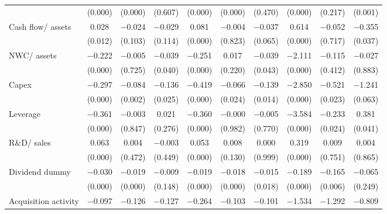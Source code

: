 \begin{longtable}{l*{9}{c}}
                    &     (0.000)&     (0.000)&     (0.607)&     (0.000)&     (0.000)&     (0.470)&     (0.000)&     (0.217)&     (0.001)\\
\addlinespace
Cash flow/ assets   &       0.028&    $-$0.024&    $-$0.029&       0.081&    $-$0.004&    $-$0.037&       0.614&    $-$0.052&    $-$0.355\\
                    &     (0.012)&     (0.103)&     (0.114)&     (0.000)&     (0.823)&     (0.065)&     (0.000)&     (0.717)&     (0.037)\\
\addlinespace
NWC/ assets         &    $-$0.222&    $-$0.005&    $-$0.039&    $-$0.251&       0.017&    $-$0.039&    $-$2.111&    $-$0.115&    $-$0.027\\
                    &     (0.000)&     (0.725)&     (0.040)&     (0.000)&     (0.220)&     (0.043)&     (0.000)&     (0.412)&     (0.883)\\
\addlinespace
Capex               &    $-$0.297&    $-$0.084&    $-$0.136&    $-$0.419&    $-$0.066&    $-$0.139&    $-$2.850&    $-$0.521&    $-$1.241\\
                    &     (0.000)&     (0.002)&     (0.025)&     (0.000)&     (0.024)&     (0.014)&     (0.000)&     (0.023)&     (0.063)\\
\addlinespace
Leverage            &    $-$0.361&    $-$0.003&       0.021&    $-$0.360&    $-$0.000&    $-$0.005&    $-$3.584&    $-$0.233&       0.381\\
                    &     (0.000)&     (0.847)&     (0.276)&     (0.000)&     (0.982)&     (0.770)&     (0.000)&     (0.024)&     (0.041)\\
\addlinespace
R\&D/ sales         &       0.063&       0.004&    $-$0.003&       0.053&       0.008&       0.000&       0.319&       0.009&       0.004\\
                    &     (0.000)&     (0.472)&     (0.449)&     (0.000)&     (0.130)&     (0.999)&     (0.000)&     (0.751)&     (0.865)\\
\addlinespace
Dividend dummy      &    $-$0.030&    $-$0.019&    $-$0.009&    $-$0.019&    $-$0.018&    $-$0.015&    $-$0.189&    $-$0.165&    $-$0.065\\
                    &     (0.000)&     (0.000)&     (0.148)&     (0.000)&     (0.000)&     (0.018)&     (0.000)&     (0.006)&     (0.249)\\
\addlinespace
Acquisition activity&    $-$0.097&    $-$0.126&    $-$0.127&    $-$0.264&    $-$0.103&    $-$0.101&    $-$1.534&    $-$1.292&    $-$0.809\\

\end{longtable}
